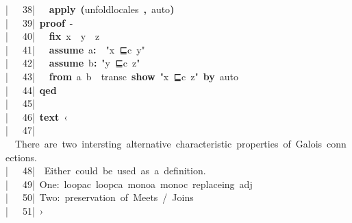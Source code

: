\documentclass{article}
\newcommand{\syntaxCOMMENTC}[1]{\textcolor[rgb]{0.4,0.0,0.8}{#1}}
\newcommand{\syntaxKEYWORDA}[1]{\textcolor[rgb]{0.0,0.4,0.6}{\textbf{#1}}}
\newcommand{\syntaxKEYWORDC}[1]{\textcolor[rgb]{0.0,0.6,1.0}{\textbf{#1}}}
\newcommand{\syntaxLITERALA}[1]{\textcolor[rgb]{1.0,0.0,0.8}{#1}}
\newcommand{\syntaxOPERATOR}[1]{\textcolor[rgb]{0.0,0.0,0.0}{\textbf{#1}}}
\newcommand{\syntaxCOMMENTC}[1]{\textcolor[rgb]{0.4,0.0,0.8}{#1}}
\newcommand{\syntaxKEYWORDA}[1]{\textcolor[rgb]{0.0,0.4,0.6}{\textbf{#1}}}
\newcommand{\syntaxKEYWORDC}[1]{\textcolor[rgb]{0.0,0.6,1.0}{\textbf{#1}}}
\newcommand{\syntaxLITERALA}[1]{\textcolor[rgb]{1.0,0.0,0.8}{#1}}
\newcommand{\syntaxOPERATOR}[1]{\textcolor[rgb]{0.0,0.0,0.0}{\textbf{#1}}}
\newcommand{\syntaxCOMMENTC}[1]{\textcolor[rgb]{0.4,0.0,0.8}{#1}}
\newcommand{\syntaxKEYWORDA}[1]{\textcolor[rgb]{0.0,0.4,0.6}{\textbf{#1}}}
\newcommand{\syntaxKEYWORDC}[1]{\textcolor[rgb]{0.0,0.6,1.0}{\textbf{#1}}}
\newcommand{\syntaxLITERALA}[1]{\textcolor[rgb]{1.0,0.0,0.8}{#1}}
\newcommand{\syntaxOPERATOR}[1]{\textcolor[rgb]{0.0,0.0,0.0}{\textbf{#1}}}
\newcommand{\syntaxCOMMENTC}[1]{\textcolor[rgb]{0.4,0.0,0.8}{\textbf{#1}}}
\newcommand{\syntaxKEYWORDA}[1]{\textcolor[rgb]{0.0,0.4,0.6}{#1}}
\newcommand{\syntaxKEYWORDC}[1]{\textcolor[rgb]{0.0,0.6,1.0}{#1}}
\newcommand{\syntaxLITERALA}[1]{\textcolor[rgb]{1.0,0.0,0.8}{\textbf{#1}}}
\newcommand{\syntaxOPERATOR}[1]{\textcolor[rgb]{0.0,0.0,0.0}{#1}}
\newcommand{\syntaxCOMMENTC}[1]{\textcolor[rgb]{0.4,0.0,0.8}{#1}}
\newcommand{\syntaxKEYWORDA}[1]{\textcolor[rgb]{0.0,0.4,0.6}{\textbf{#1}}}
\newcommand{\syntaxKEYWORDC}[1]{\textcolor[rgb]{0.0,0.6,1.0}{\textbf{#1}}}
\newcommand{\syntaxLITERALA}[1]{\textcolor[rgb]{1.0,0.0,0.8}{#1}}
\newcommand{\syntaxOPERATOR}[1]{\textcolor[rgb]{0.0,0.0,0.0}{\textbf{#1}}}
\newcommand{\syntaxCOMMENTC}[1]{\textcolor[rgb]{0.4,0.0,0.8}{#1}}
\newcommand{\syntaxKEYWORDA}[1]{\textcolor[rgb]{0.0,0.4,0.6}{\textbf{#1}}}
\newcommand{\syntaxKEYWORDC}[1]{\textcolor[rgb]{0.0,0.6,1.0}{\textbf{#1}}}
\newcommand{\syntaxLITERALA}[1]{\textcolor[rgb]{1.0,0.0,0.8}{#1}}
\newcommand{\syntaxOPERATOR}[1]{\textcolor[rgb]{0.0,0.0,0.0}{\textbf{#1}}}
\newcommand{\syntaxCOMMENTC}[1]{\textcolor[rgb]{0.0,0.0,0.0}{#1}}
\newcommand{\syntaxKEYWORDA}[1]{\textcolor[rgb]{0.0,0.0,0.0}{#1}}
\newcommand{\syntaxKEYWORDC}[1]{\textcolor[rgb]{0.0,0.0,0.0}{#1}}
\newcommand{\gutter}[1]{\textcolor[rgb]{0,0,0}{{|}#1}}
\newcommand{\gutterH}[1]{\textcolor[rgb]{1,0,0}{{|}#1}}
\begin{document}
\gutter{\ \ \ 38{|}\ }{\ }{\ }\syntaxKEYWORDA{apply}{\ }\syntaxOPERATOR{(}unfold\usebox{\underscorebox}locales{\ }\syntaxOPERATOR{,}{\ }auto\syntaxOPERATOR{)}{\ }{\ }{\ }{\ }\hspace*{\fill}\\
\gutter{\ \ \ 39{|}\ }\syntaxKEYWORDA{proof}{\ }{-}\hspace*{\fill}\\
\gutterH{\ \ \ 40{|}\ }{\ }{\ }\syntaxKEYWORDC{fix}{\ }x{\ }{\ }y{\ }{\ }z{\ }{\ }\hspace*{\fill}\\
\gutter{\ \ \ 41{|}\ }{\ }{\ }\syntaxKEYWORDC{assume}{\ }a\syntaxOPERATOR{:}{\ }{\ }\syntaxLITERALA{"x{\ }⊑c{\ }y"}\hspace*{\fill}\\
\gutter{\ \ \ 42{|}\ }{\ }{\ }\syntaxKEYWORDC{assume}{\ }b\syntaxOPERATOR{:}{\ }\syntaxLITERALA{"y{\ }⊑c{\ }z"}\hspace*{\fill}\\
\gutter{\ \ \ 43{|}\ }{\ }{\ }\syntaxKEYWORDA{from}{\ }a{\ }b{\ }{\ }transc{\ }\syntaxKEYWORDC{show}{\ }\syntaxLITERALA{"x{\ }⊑c{\ }z"}{\ }\syntaxKEYWORDA{by}{\ }auto{\ }\hspace*{\fill}\\
\gutter{\ \ \ 44{|}\ }\syntaxKEYWORDA{qed}{\ }\hspace*{\fill}\\
\gutterH{\ \ \ 45{|}\ }\hspace*{\fill}\\
\gutter{\ \ \ 46{|}\ }\syntaxKEYWORDA{text}{\ }\syntaxCOMMENTC{‹}\hspace*{\fill}\\
\gutter{\ \ \ 47{|}\ }\syntaxCOMMENTC{{\ }There{\ }are{\ }two{\ }intersting{\ }alternative{\ }characteristic{\ }properties{\ }of{\ }Galois{\ }connections.}\hspace*{\fill}\\
\gutter{\ \ \ 48{|}\ }\syntaxCOMMENTC{{\ }Either{\ }could{\ }be{\ }used{\ }as{\ }a{\ }definition.}\hspace*{\fill}\\
\gutter{\ \ \ 49{|}\ }\syntaxCOMMENTC{One:{\ }loopac{\ }loopca{\ }monoa{\ }monoc{\ }replaceing{\ }adj}\hspace*{\fill}\\
\gutterH{\ \ \ 50{|}\ }\syntaxCOMMENTC{Two:{\ }preservation{\ }of{\ }Meets{\ }/{\ }Joins}\hspace*{\fill}\\
\gutter{\ \ \ 51{|}\ }\syntaxCOMMENTC{›}\hspace*{\fill}\\
\end{document}
